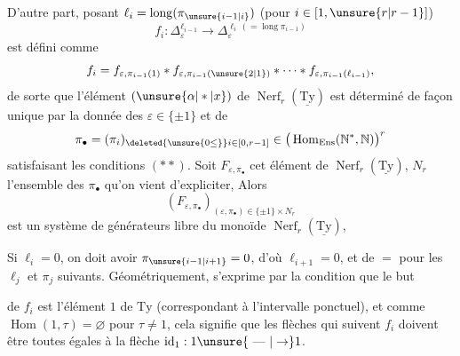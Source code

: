 D'autre part,  posant $\ell_i=\operatorname{long}(\pi_{\unsure{i-1|i}})$ (pour $i\in[1,\unsure{r|r-1}]$)
\[
 f_i:\Delta_\varepsilon^{\ell_{i-1}}\longrightarrow\Delta_\varepsilon^{\ell_i\,(=\operatorname{long}\pi_{i-1})}
\]
est défini comme
\[
 f_i=f_{\varepsilon,\pi_{i-1}(1)}*f_{\varepsilon,\pi_{i-1}(\unsure{2|1})}*
 \cdots*f_{\varepsilon,\pi_{i-1}(\ell_{i-1})},
\]
de sorte que l'élément $(\unsure{\alpha|*|x})$ de $\operatorname{Nerf}_r(\underline{\mathrm{Ty}})$ est déterminé de façon unique par la donnée des \deleted{$\unsure{\pi}$} $\varepsilon\in\{\pm1\}$ et de
\[
\pi_{\bullet}=(\pi_i)_{\deleted{\unsure{0\leq}}i\in[0,r-1]}
 \in\big(\operatorname{Hom}_{\mathrm{Ens}}(\mathbb N^*,\mathbb N)\big)^r
\]
satisfaisant les conditions $(**)$.  Soit $F_{\varepsilon,\pi_\bullet}$  cet élément de $\operatorname{Nerf}_r(\underline{\mathrm{Ty}})$,   $N_r$ l'ensemble des $\pi_\bullet$ qu'on vient d'expliciter, Alors
\[
(F_{\varepsilon,\pi_\bullet})_{(\varepsilon,\pi_\bullet)\in\{\pm1\}\times N_r}
\]
est un système de générateurs libre du monoïde $\operatorname{Nerf}_r(\underline{\mathrm{Ty}})$,

Si $\ell_i=0$, on doit avoir  $\pi_{\unsure{i-1|i+1}}=0$, d'où $\ell_{i+1}=0$, et de $=$ pour les $\ell_j$ et $\pi_j$ suivants. Géométriquement,  s'exprime par la condition que le but


de $f_i$ est l'élément $1$ de $\mathrm{Ty}$ (correspondant à l'intervalle ponctuel), et comme $\operatorname{Hom}(1,\tau)=\varnothing$ pour $\tau\neq1$, cela signifie que les flèches qui suivent $f_i$ doivent être toutes égales à la flèche $\mathrm{id}_1:1\unsure{\text{ --- }|\to}1$.


